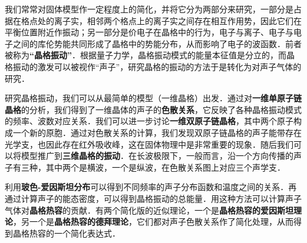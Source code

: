 
我们常常对固体模型作一定程度上的简化，并将它分为两部分来研究，一部分是占据在格点处的离子实，相邻两个格点上的离子实之间存在相互作用势，因此它们在平衡位置附近作振动；另一部分是价电子在晶格中的行为，电子与离子、电子与电子之间的库伦势能共同形成了晶格中的势能分布，从而影响了电子的波函数．前者被称为\textbf{“晶格振动”}．根据量子力学，晶格振动模式的能量本征值是分立的，而晶格振动的激发可以被视作“声子”，研究晶格的振动的方法于是转化为对声子气体的研究．

研究晶格振动，我们可以从最简单的模型（一维晶格）出发．通过对\textbf{一维单原子链晶格}的分析，我们得到了一维晶体的声子的\textbf{色散关系}，它反映了各种晶格振动模式的频率、波数对应关系．我们可以进一步讨论\textbf{一维双原子链晶格}，其中两个原子构成一个新的原胞．通过对色散关系的计算，我们发现双原子链晶格的声子能带存在光学支，也因此存在红外吸收峰，这在固体物理中是非常重要的现象．随后我们可以将模型推广到\textbf{三维晶格的振动}．在长波极限下，一般而言，沿一个方向传播的声子有三种，其中两个是横波，一个是纵波，在色散关系图上对应三个声学支．

利用\textbf{玻色-爱因斯坦分布}可以得到不同频率的声子分布函数和温度之间的关系．再通过计算声子的能态密度，可以得到晶格振动的总能量．用这种方法可以计算声子气体对\textbf{晶格热容}的贡献．有两个简化版的近似理论，一个是\textbf{晶格热容的爱因斯坦理论}，另一个是\textbf{晶格热容的德拜理论}，它们都对声子色散关系作了简化处理，从而得到晶格热容的一个简化表达式．